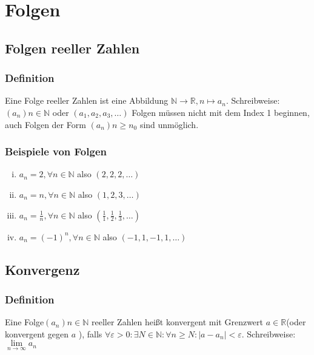 \documentclass{scrreprt}
\newcommand{\NN}{\mathbb{N}}
\newcommand{\RR}{\mathbb{R}}
\begin{document}
	\chapter{Folgen}
	\section{Folgen reeller Zahlen}
		\subsection{Definition}
		Eine Folge reeller Zahlen ist eine Abbildung $\NN \longrightarrow \RR , n \mapsto a_n $. Schreibweise: $ (a_n ) n \in \NN $ oder $ (a_1 , a_2 ,a_3 , \dots )$
		Folgen müssen nicht mit dem Index 1 beginnen, auch Folgen der Form $(a_n ) n \geq n_0 $ sind unmöglich.
		
		\subsection{Beispiele von Folgen}
		\begin{enumerate}[i)]
			\item $a_n =2 ,\forall n \in \NN$ also $(2,2,2,\dots )$
			\item $a_n = n ,\forall n \in \NN$ also $(1,2,3,\dots )$
			\item $a_n = \frac{1}{n},\forall n \in \NN$ also $(\frac{1}{1},\frac{1}{2},\frac{1}{3}, \dots )$
			\item $a_n =(-1)^n , \forall n \in \NN$ also $(-1,1,-1,1, \dots )$
		\end{enumerate}
	\section{Konvergenz}
		\subsection{Definition}
		Eine Folge$(a_n ) n \in \NN$ reeller Zahlen heißt konvergent mit Grenzwert $a \in \RR$(oder \glqq konvergent gegen $a$ \grqq ), falls $\forall \varepsilon > 0 :\exists N \in \NN :\forall n \geq N:|a-a_n | < \varepsilon$. Schreibweise: $\lim\limits_{n \rightarrow \infty}{a_n}$
\end{document}
